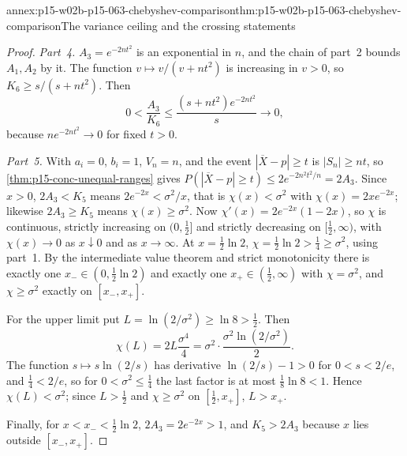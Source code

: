 \begin{annexitem}{annex:p15-w02b-p15-063-chebyshev-comparison}{thm:p15-w02b-p15-063-chebyshev-comparison}{The variance ceiling and the crossing statements}
\begin{proof}
\emph{Part~4.} \(A_3=e^{-2nt^2}\) is an exponential in \(n\), and the
chain of part~2 bounds \(A_1,A_2\) by it. The function
\(v\mapsto v/(v+nt^2)\) is increasing in \(v>0\), so \(K_6\geq s/(s+nt^2)\).
Then
\[
 0<\frac{A_3}{K_6}\leq\frac{(s+nt^2)e^{-2nt^2}}{s}\longrightarrow0,
\]
because \(ne^{-2nt^2}\to0\) for fixed \(t>0\).

\emph{Part~5.} With \(a_i=0\), \(b_i=1\), \(V_n=n\), and the event
\(|\overline X-p|\geq t\) is \(|S_n|\geq nt\), so
\cref{thm:p15-conc-unequal-ranges} gives
\(P(|\overline X-p|\geq t)\leq2e^{-2n^2t^2/n}=2A_3\). Since \(x>0\),
\(2A_3<K_5\) means \(2e^{-2x}<\sigma^2/x\), that is \(\chi(x)<\sigma^2\)
with \(\chi(x)=2xe^{-2x}\); likewise \(2A_3\geq K_5\) means
\(\chi(x)\geq\sigma^2\). Now
\(\chi'(x)=2e^{-2x}(1-2x)\), so \(\chi\) is continuous, strictly
increasing on \((0,\tfrac12]\) and strictly decreasing on
\([\tfrac12,\infty)\), with \(\chi(x)\to0\) as \(x\downarrow0\) and as
\(x\to\infty\). At \(x=\tfrac12\ln2\), \(\chi=\tfrac12\ln2>\tfrac14\geq
\sigma^2\), using part~1. By the intermediate value theorem and strict
monotonicity there is exactly one \(x_-\in(0,\tfrac12\ln2)\) and exactly
one \(x_+\in(\tfrac12,\infty)\) with \(\chi=\sigma^2\), and
\(\chi\geq\sigma^2\) exactly on \([x_-,x_+]\).

For the upper limit put \(L=\ln(2/\sigma^2)\geq\ln8>\tfrac12\). Then
\[
 \chi(L)=2L\frac{\sigma^4}4=\sigma^2\cdot\frac{\sigma^2\ln(2/\sigma^2)}2 .
\]
The function \(s\mapsto s\ln(2/s)\) has derivative \(\ln(2/s)-1>0\) for
\(0<s<2/e\), and \(\tfrac14<2/e\), so for \(0<\sigma^2\leq\tfrac14\) the
last factor is at most \(\tfrac18\ln8<1\). Hence \(\chi(L)<\sigma^2\);
since \(L>\tfrac12\) and \(\chi\geq\sigma^2\) on \([\tfrac12,x_+]\),
\(L>x_+\).

Finally, for \(x<x_-<\tfrac12\ln2\), \(2A_3=2e^{-2x}>1\), and
\(K_5>2A_3\) because \(x\) lies outside \([x_-,x_+]\).
\end{proof}
\end{annexitem}

